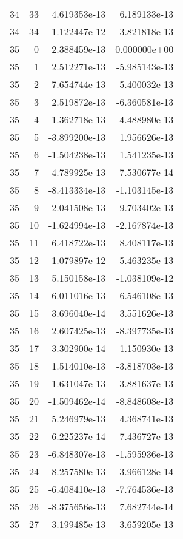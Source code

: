 \begin{tabular}{rrrr}
  34 &   33 &  4.619353e-13 &  6.189133e-13 \\
  34 &   34 & -1.122447e-12 &  3.821818e-13 \\
  35 &    0 &  2.388459e-13 &  0.000000e+00 \\
  35 &    1 &  2.512271e-13 & -5.985143e-13 \\
  35 &    2 &  7.654744e-13 & -5.400032e-13 \\
  35 &    3 &  2.519872e-13 & -6.360581e-13 \\
  35 &    4 & -1.362718e-13 & -4.488980e-13 \\
  35 &    5 & -3.899200e-13 &  1.956626e-13 \\
  35 &    6 & -1.504238e-13 &  1.541235e-13 \\
  35 &    7 &  4.789925e-13 & -7.530677e-14 \\
  35 &    8 & -8.413334e-13 & -1.103145e-13 \\
  35 &    9 &  2.041508e-13 &  9.703402e-13 \\
  35 &   10 & -1.624994e-13 & -2.167874e-13 \\
  35 &   11 &  6.418722e-13 &  8.408117e-13 \\
  35 &   12 &  1.079897e-12 & -5.463235e-13 \\
  35 &   13 &  5.150158e-13 & -1.038109e-12 \\
  35 &   14 & -6.011016e-13 &  6.546108e-13 \\
  35 &   15 &  3.696040e-14 &  3.551626e-13 \\
  35 &   16 &  2.607425e-13 & -8.397735e-13 \\
  35 &   17 & -3.302900e-14 &  1.150930e-13 \\
  35 &   18 &  1.514010e-13 & -3.818703e-13 \\
  35 &   19 &  1.631047e-13 & -3.881637e-13 \\
  35 &   20 & -1.509462e-14 & -8.848608e-13 \\
  35 &   21 &  5.246979e-13 &  4.368741e-13 \\
  35 &   22 &  6.225237e-14 &  7.436727e-13 \\
  35 &   23 & -6.848307e-13 & -1.595936e-13 \\
  35 &   24 &  8.257580e-13 & -3.966128e-14 \\
  35 &   25 & -6.408410e-13 & -7.764536e-13 \\
  35 &   26 & -8.375656e-13 &  7.682744e-14 \\
  35 &   27 &  3.199485e-13 & -3.659205e-13 \\

\end{tabular}
